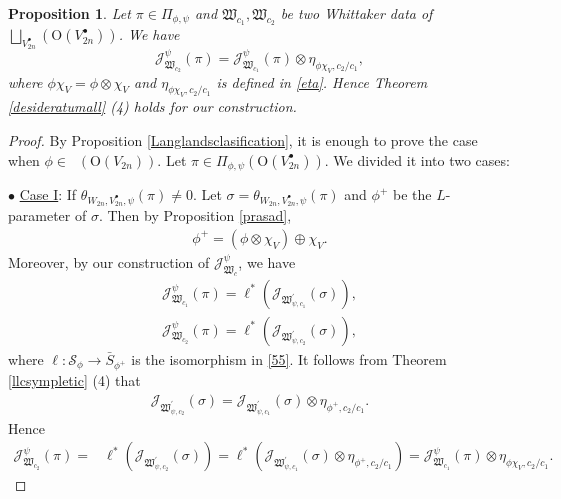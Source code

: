 \documentclass[article]{article}
\numberwithin{equation}{section}
\newtheorem{proposition}[theorem]{Proposition}
\theoremstyle{definition}
\DeclareMathOperator{\Para}{\Phi_{temp}}
\begin{document}
\begin{proposition}\label{changeofwhittakerdatum}
	Let $\pi\in \Pi_{\phi,\psi}$ and $\mathfrak W_{c_1},\mathfrak W_{c_2}$ be two Whittaker data of $\bigsqcup_{V_{2n}^{\bullet}}(\mathrm O(V_{2n}^\bullet))$. We have 
	$$
	\mathcal J^\psi_{\mathfrak W_{c_2}}(\pi)=\mathcal J^\psi_{\mathfrak W_{c_1}}(\pi)\otimes \eta_{\phi\chi_{V},c_2/c_1},
	$$
	where $\phi\chi_{V}=\phi\otimes\chi_{V}$ and $\eta_{\phi\chi_{V},c_2/c_1}$ is defined in \ref{eta}. Hence Theorem \ref{desideratumall} (4) holds for our construction.
\end{proposition}
\begin{proof}
By Proposition \ref{Langlandsclasification}, it is enough to prove the case when  $\phi\in \Para(\mathrm O(V_{2n}))$. Let $\pi\in \Pi_{\phi,\psi}(\mathrm O(V_{2n}^\bullet))$. We divided it into two cases: 
	
	$\bullet$ \underline{Case I}: If $\theta_{W_{2n},V_{2n}^\bullet, \psi}(\pi)\neq 0$. Let $\sigma=\theta_{W_{2n},V_{2n}^\bullet, \psi}(\pi)$ and $\phi^+$ be the $L$-parameter of $\sigma$. Then by Proposition \ref{prasad}, 
	\begin{align*}
	\phi^+=(\phi\otimes\chi_{V})\oplus \chi_{V}.
	\end{align*}
	Moreover, by our construction of $\mathcal J^\psi_{\mathfrak W_{c}}$, we have 
	\begin{align*}
	\mathcal J^\psi_{\mathfrak W_{c_1}}(\pi)=\ell^*(\mathcal J_{\mathfrak W^\prime_{\psi,c_1}}(\sigma)),\\
	\mathcal J^\psi_{\mathfrak W_{c_2}}(\pi)=\ell^*(\mathcal J_{\mathfrak W^\prime_{\psi,c_2}}(\sigma)), 
	\end{align*}
	where $\ell: \mathcal {S}_{\phi}\rightarrow \bar S_{\phi^+}$ is the isomorphism  in \ref{55}. It follows from Theorem \ref{llcsympletic} (4) that 
	\begin{align*}
	\mathcal J_{\mathfrak W^\prime_{\psi,c_2}}(\sigma)= \mathcal J_{\mathfrak W^\prime_{\psi,c_1}}(\sigma)\otimes \eta_{\phi^+,c_2/c_1}. 
	\end{align*}
	Hence 
	\begin{align*}
	\mathcal J^\psi_{\mathfrak W_{c_2}}(\pi)=&\ell^*(\mathcal J_{\mathfrak W^\prime_{\psi,c_2}}(\sigma))=\ell^*(\mathcal J_{\mathfrak W^\prime_{\psi,c_1}}(\sigma)\otimes \eta_{\phi^+,c_2/c_1})
	=\mathcal J^\psi_{\mathfrak W_{c_1}}(\pi)\otimes\eta_{\phi\chi_{V},c_2/c_1}. 
	\end{align*}
	

\end{proof}
\end{document}
